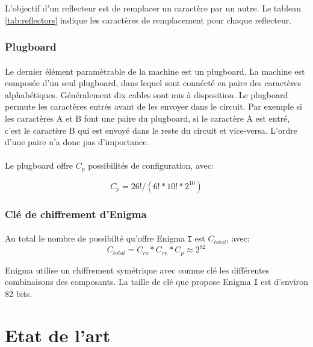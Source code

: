 \documentclass[letterpaper]{article}
\begin{document}
L'objectif d'un reflecteur est de remplacer un caractère par un autre. Le tableau \ref{tab:reflectors} indique les caractères de remplacement pour chaque reflecteur.

\subsubsection{Plugboard}

\paragraph{}

Le dernier élément paramètrable de la machine est un plugboard. La machine est composée d'un seul plugboard, dans lequel sont connécté en paire des caractères alphabétiques. Généralement dix cables sont mis à disposition.
Le plugboard permute les caractères entrés avant de les envoyer dans le circuit. Par exemple si les caractères A et B font une paire du plugboard, si le caractère A est entré, c'est le caractère B qui est envoyé dans le reste du circuit et vice-versa. L'ordre d'une paire n'a donc pas d'importance.

\paragraph{}
Le plugboard offre $C_p$ possibilités de configuration, avec:

\[
C_p = 26! / (6!*10!*2^{10})
\]


\subsubsection{Clé de chiffrement d'Enigma}

\paragraph{}
Au total le nombre de possibilté qu'offre Enigma \texttt{I} est $C_{total}$, avec:
\[
C_{total} = C_{ro} * C_{re} * C_p \approx  2^{82}
\]

Enigma utilise un chiffrement symétrique avec comme clé les différentes combinaisons des composants. La taille de clé que propose Enigma \texttt{I} est d'environ 82 bits.

\section{Etat de l'art}

\paragraph{}
\end{document}

